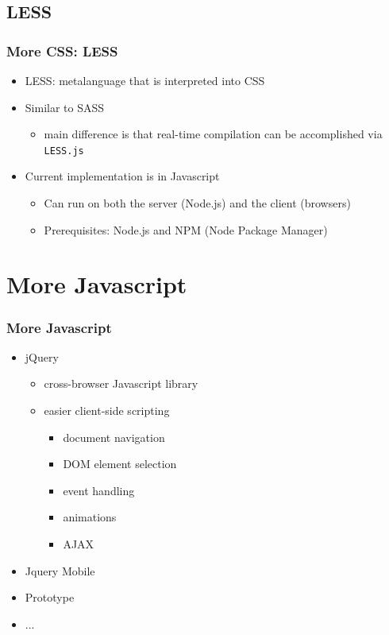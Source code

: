 \documentclass{beamer}
\begin{document}
\subsection{LESS}
\begin{frame}[fragile]\frametitle{More CSS: LESS} 

  \begin{itemize}
    \item LESS: metalanguage that is interpreted into CSS
    \item Similar to SASS
    \begin{itemize}
      \item main difference is that real-time compilation can be accomplished via \texttt{LESS.js}
    \end{itemize}
    \item Current implementation is in Javascript
    \begin{itemize}
      \item Can run on both the server (Node.js) and the client (browsers)
      \item Prerequisites: Node.js and NPM (Node Package Manager)
    \end{itemize}
  \end{itemize}

\end{frame}



\section{More Javascript} 
\begin{frame}[fragile]\frametitle{More Javascript} 

  \begin{itemize}
    \item jQuery
    \begin{itemize}
      \item cross-browser Javascript library
      \item easier client-side scripting
      \begin{itemize}
        \item document navigation
        \item DOM element selection
        \item event handling
        \item animations
        \item AJAX
      \end{itemize}
    \end{itemize}
    \item Jquery Mobile
    \item Prototype
    \item ...
  \end{itemize}
\end{frame}
\end{document}

